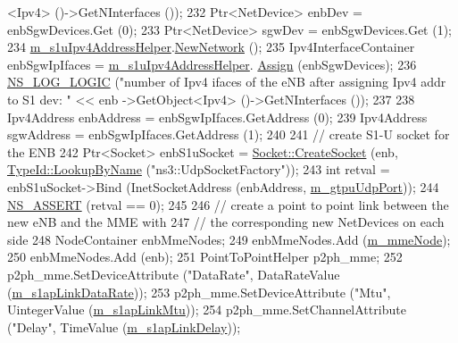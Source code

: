 \begin{DoxyCode}
      <Ipv4> ()->GetNInterfaces ());  
232   Ptr<NetDevice> enbDev = enbSgwDevices.Get (0);
233   Ptr<NetDevice> sgwDev = enbSgwDevices.Get (1);
234   \hyperlink{classns3_1_1MmWavePointToPointEpcHelper_ac6d52e4132f31a255661f788c69be95b}{m\_s1uIpv4AddressHelper}.\hyperlink{classns3_1_1Ipv4AddressHelper_a3277d133ef0d2669934a16a8206ba8e4}{NewNetwork} ();
235   Ipv4InterfaceContainer enbSgwIpIfaces = \hyperlink{classns3_1_1MmWavePointToPointEpcHelper_ac6d52e4132f31a255661f788c69be95b}{m\_s1uIpv4AddressHelper}.
      \hyperlink{classns3_1_1Ipv4AddressHelper_af8e7f4a1a7e74c00014a1eac445a27af}{Assign} (enbSgwDevices);
236   \hyperlink{group__logging_ga88acd260151caf2db9c0fc84997f45ce}{NS\_LOG\_LOGIC} (\textcolor{stringliteral}{"number of Ipv4 ifaces of the eNB after assigning Ipv4 addr to S1 dev: "} << enb
      ->GetObject<Ipv4> ()->GetNInterfaces ());
237   
238   Ipv4Address enbAddress = enbSgwIpIfaces.GetAddress (0);
239   Ipv4Address sgwAddress = enbSgwIpIfaces.GetAddress (1);
240 
241   \textcolor{comment}{// create S1-U socket for the ENB}
242   Ptr<Socket> enbS1uSocket = \hyperlink{classns3_1_1Socket_ad448a62bb50ad3dbac59c879a885a8d2}{Socket::CreateSocket} (enb, 
      \hyperlink{classns3_1_1TypeId_a119cf99c20931fdc294602cd360b180e}{TypeId::LookupByName} (\textcolor{stringliteral}{"ns3::UdpSocketFactory"}));
243   \textcolor{keywordtype}{int} retval = enbS1uSocket->Bind (InetSocketAddress (enbAddress, \hyperlink{classns3_1_1MmWavePointToPointEpcHelper_af751b4022bf80a9ea76f18805534a9d0}{m\_gtpuUdpPort}));
244   \hyperlink{assert_8h_a6dccdb0de9b252f60088ce281c49d052}{NS\_ASSERT} (retval == 0);
245   
246   \textcolor{comment}{// create a point to point link between the new eNB and the MME with}
247   \textcolor{comment}{// the corresponding new NetDevices on each side}
248   NodeContainer enbMmeNodes;
249   enbMmeNodes.Add (\hyperlink{classns3_1_1MmWavePointToPointEpcHelper_a4e2e32e1abb0ca817e30be4eb46ebfd0}{m\_mmeNode});
250   enbMmeNodes.Add (enb);
251   PointToPointHelper p2ph\_mme;
252   p2ph\_mme.SetDeviceAttribute (\textcolor{stringliteral}{"DataRate"}, DataRateValue (\hyperlink{classns3_1_1MmWavePointToPointEpcHelper_a44dd93ffe2c0e326f3fd61e132c59f24}{m\_s1apLinkDataRate}));
253   p2ph\_mme.SetDeviceAttribute (\textcolor{stringliteral}{"Mtu"}, UintegerValue (\hyperlink{classns3_1_1MmWavePointToPointEpcHelper_a5c9ee81e5708d30dc59e1f66bcfe226b}{m\_s1apLinkMtu}));
254   p2ph\_mme.SetChannelAttribute (\textcolor{stringliteral}{"Delay"}, TimeValue (\hyperlink{classns3_1_1MmWavePointToPointEpcHelper_a1fe106e13b5ec03c2e14d91abff84f7e}{m\_s1apLinkDelay}));  

\end{DoxyCode}
